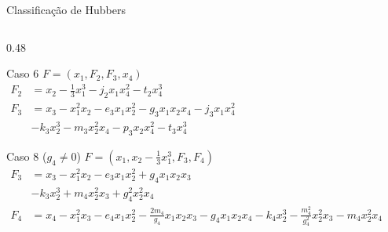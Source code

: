 \begin{frame}{Classificação de Hubbers}
\begin{columns}[t]
        \begin{column}{0.48\textwidth}
            \begin{block}{Caso 6}
                $F = (x_1, F_2, F_3, x_4)$ \\
                \vspace{0.2em}
                $\begin{aligned}
                    F_2 &= x_2 - \tfrac{1}{3} x_1^3 - j_2 x_1 x_4^2 - t_2 x_4^3 \\
                    F_3 &= x_3 - x_1^2 x_2 - e_3 x_1 x_2^2 - g_3 x_1 x_2 x_4 
                    - j_3 x_1 x_4^2 \\&- k_3 x_2^3 - m_3 x_2^2 x_4 - p_3 x_2 x_4^2 
                    - t_3 x_4^3
                \end{aligned}$
            \end{block}
            \vspace{0.65cm}
            \begin{block}{Caso 8 ($g_4 \neq 0$)}
                \tiny
                $F = (x_1, x_2 - \tfrac{1}{3} x_1^3, F_3, F_4)$ \\
                \vspace{0.2em}
                $\begin{aligned}
                    F_3 &= x_3 - x_1^2 x_2 - e_3 x_1 x_2^2 + g_4 x_1 x_2 x_3 \\
                    &- k_3 x_2^3 + m_4 x_2^2 x_3 + g_4^2 x_2^2 x_4 \\
                    F_4 &= x_4 - x_1^2 x_3 - e_4 x_1 x_2^2 - \tfrac{2 m_4}{g_4} x_1 x_2 x_3 - g_4 x_1 x_2 x_4 - k_4 x_2^3 - \tfrac{m_4^2}{g_4^2} x_2^2 x_3 - m_4 x_2^2 x_4 ~~~~~~~~.
                \end{aligned}$
            \end{block}
        \end{column}
    \end{columns}
\end{frame}